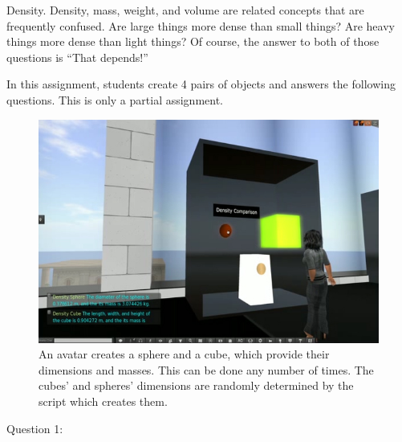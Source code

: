 \documentclass[11.5pt]{sig-alternate} %
\begin{document}
\begin{large}
Density. Density, mass, weight, and volume are related concepts that are frequently confused. Are large things more dense than small things? Are heavy things more dense than light things? Of course, the answer to both of those questions is “That depends!”

In this assignment, students create 4 pairs of objects and answers the following questions. This is only a partial assignment.

\begin{figure}[h]
    \centering
    \includegraphics[width=1\linewidth]{fig 5.jpg}
    \caption{An avatar creates a sphere and a cube, which provide their dimensions and masses. This can be done any number of times. The cubes’ and spheres’ dimensions are randomly determined by the script which creates them.}
\end{figure}

\newpage
Question 1:


\end{large}
\end{document}
